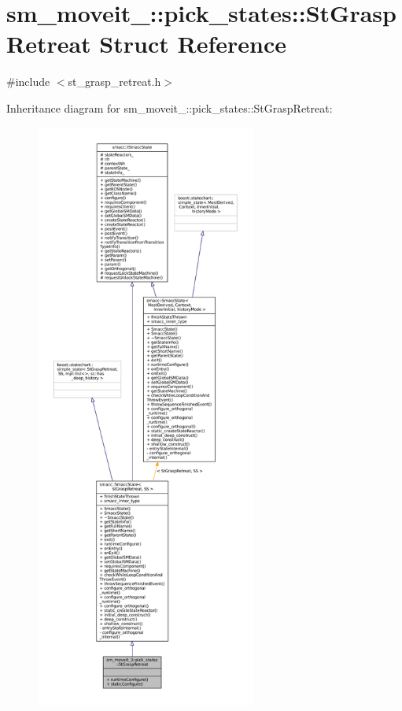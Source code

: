 \hypertarget{structsm__moveit__3_1_1pick__states_1_1StGraspRetreat}{}\section{sm\+\_\+moveit\+\_\+:\+:pick\+\_\+states\+:\+:St\+Grasp\+Retreat Struct Reference}
\label{structsm__moveit__3_1_1pick__states_1_1StGraspRetreat}


{\ttfamily \#include $<$st\+\_\+grasp\+\_\+retreat.\+h$>$}



Inheritance diagram for sm\+\_\+moveit\+\_\+:\+:pick\+\_\+states\+:\+:St\+Grasp\+Retreat\+:
\nopagebreak
\begin{figure}[H]
\begin{center}
\leavevmode
\includegraphics[height=550pt]{structsm__moveit__3_1_1pick__states_1_1StGraspRetreat__inherit__graph}
\end{center}
\end{figure}


